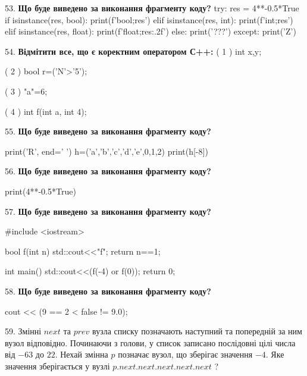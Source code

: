 \documentclass[11pt]{article}
\begin{document}
\par\vspace{5mm}

53. \textbf{Що буде виведено за виконання фрагменту коду?}
try:
    res = 4**-0.5*True
    if isinstance(res, bool):
        print(f'bool;{res}')
    elif isinstance(res, int):
        print(f'int;{res}')
    elif isinstance(res, float):
        print(f'float;{res:.2f}')
    else:
        print('???')
except:
    print('Z')
\par\vspace{5mm}

54. %
\textbf{Відмітити все, що є коректним оператором С++:}
( 1 ) int x,y;

( 2 ) bool r=('N'>'5');

( 3 ) "a"=6;

( 4 ) int f(int a, int 4);
\par\vspace{5mm}

55. \textbf{Що буде виведено за виконання фрагменту коду?}

print('R', end=' ')
h=('a','b','c','d','e',0,1,2)
print(h[-8])

\par\vspace{5mm}

56. \textbf{Що буде виведено за виконання фрагменту коду?}

print(4**-0.5*True)
\par\vspace{5mm}

57. \textbf{Що буде виведено за виконання фрагменту коду?}

#include <iostream>

bool f(int n){
    std::cout<<"f";
    return n==1;
}

int main(){
    std::cout<<(f(-4) or f(0));
    return 0;
}
\par\vspace{5mm}

58. \textbf{Що буде виведено за виконання фрагменту коду?}

cout << (9 == 2 < false != 9.0);
\par\vspace{5mm}

59. 
Змінні $next$ та $prev$ вузла списку позначають наступний та попередній за ним вузол відповідно. Починаючи з голови, у список записано послідовні цілі числа від $-63$ до $22$. Нехай змінна $p$ позначає вузол, що зберігає значення $-4$.
Яке значення зберігається у вузлі $p.next.next.next.next.next$ ?
\par\vspace{5mm}
\end{document}
